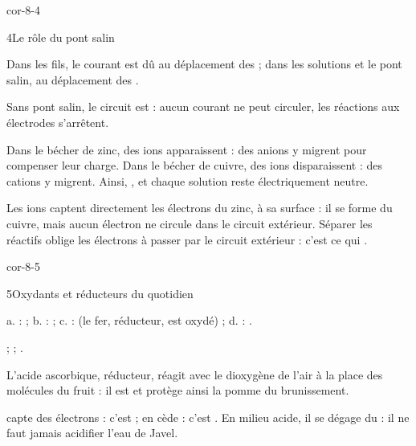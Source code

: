 \begin{blocLivre}{cor-8-4}
\begin{corrige}{4}{Le rôle du pont salin}
\begin{questions}
\item Dans les fils, le courant est dû au déplacement des  ; dans les solutions et le pont salin, au
déplacement des .
\item Sans pont salin, le circuit est  : aucun courant ne peut circuler, les réactions aux électrodes
s'arrêtent.
\item Dans le bécher de zinc, des ions  apparaissent : des anions  y migrent pour compenser leur charge.
Dans le bécher de cuivre, des ions  disparaissent : des cations  y migrent. Ainsi, , et chaque solution reste électriquement neutre.
\item Les ions  captent directement les électrons du zinc, à sa surface : il se forme du cuivre, mais aucun
électron ne circule dans le circuit extérieur. Séparer les réactifs oblige les électrons à passer par le circuit
extérieur : c'est ce qui .
\end{questions}
\end{corrige}
\end{blocLivre}
\begin{blocLivre}{cor-8-5}
\begin{corrige}{5}{Oxydants et réducteurs du quotidien}
\begin{questions}
\item a.  :  ; b.  :  ; c.  :  (le fer, réducteur,
est oxydé) ; d.  : .
\item {} ;  ; .
\item L'acide ascorbique, réducteur, réagit avec le dioxygène de l'air à la place des molécules du fruit : il est
 et protège ainsi la pomme du brunissement.
\item {} capte des électrons : c'est  ;  en cède : c'est . En
milieu acide, il se dégage du  : il ne faut jamais acidifier l'eau de Javel.
\end{questions}
\end{corrige}
\end{blocLivre}

